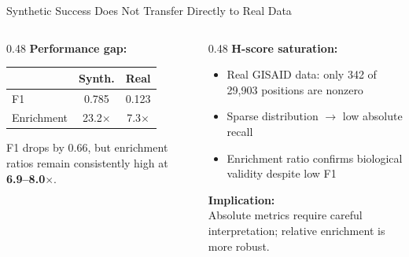 \documentclass[aspectratio=169,11pt]{beamer}
\begin{document}
\begin{frame}{Synthetic Success Does Not Transfer Directly to Real Data}

\begin{columns}[T]
\begin{column}{0.48\textwidth}
\textbf{Performance gap:}
\begin{center}
\begin{tabular}{lcc}
\toprule
& \textbf{Synth.} & \textbf{Real} \\
\midrule
F1 & 0.785 & \alert{0.123} \\
Enrichment & 23.2$\times$ & 7.3$\times$ \\
\bottomrule
\end{tabular}
\end{center}

\vspace{0.5em}
F1 drops by \alert{0.66}, but enrichment ratios remain consistently high at \textbf{6.9--8.0$\times$}.
\end{column}

\begin{column}{0.48\textwidth}
\textbf{H-score saturation:}
\begin{itemize}
  \item Real GISAID data: only 342 of 29,903 positions are nonzero
  \item Sparse distribution $\to$ low absolute recall
  \item Enrichment ratio confirms biological validity despite low F1
\end{itemize}

\vspace{0.5em}
\textbf{Implication:}\\
Absolute metrics require careful interpretation; relative enrichment is more robust.
\end{column}
\end{columns}
\end{frame}
\end{document}
